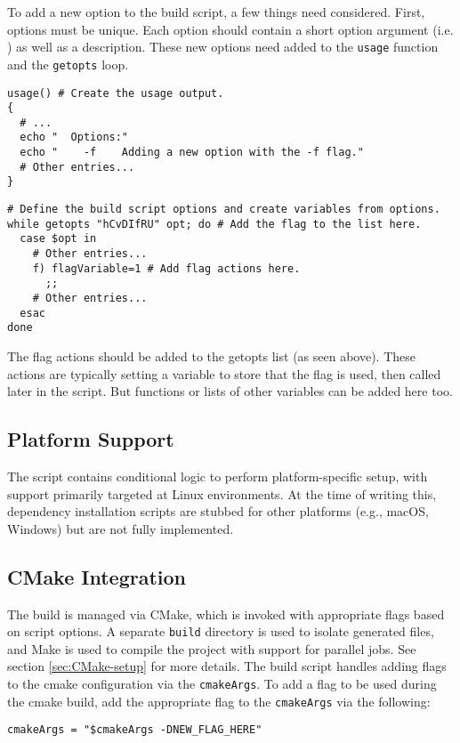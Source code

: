 To add a new option to the build script, a few things need considered. First, options must be unique. Each option should contain a short option argument (i.e. ) as well as a description. These new options need added to the \texttt{usage} function and the \texttt{getopts} loop.
\begin{lstlisting}[style=shellstyle]
usage() # Create the usage output.
{
  # ...
  echo "  Options:"
  echo "    -f    Adding a new option with the -f flag."
  # Other entries...
}
\end{lstlisting}
\begin{lstlisting}[style=shellstyle]
# Define the build script options and create variables from options.
while getopts "hCvDIfRU" opt; do # Add the flag to the list here.
  case $opt in
    # Other entries...
    f) flagVariable=1 # Add flag actions here.
      ;;
    # Other entries...
  esac
done
\end{lstlisting}
The flag actions should be added to the getopts list (as seen above). These actions are typically setting a variable to store that the flag is used, then called later in the script. But functions or lists of other variables can be added here too.

\subsection{Platform Support}

The script contains conditional logic to perform platform-specific setup, with support primarily targeted at Linux environments. At the time of writing this, dependency installation scripts are stubbed for other platforms (e.g., macOS, Windows) but are not fully implemented.

\subsection{CMake Integration}

The build is managed via CMake, which is invoked with appropriate flags based on script options. A separate \texttt{build} directory is used to isolate generated files, and Make is used to compile the project with support for parallel jobs. See section \ref{sec:CMake-setup} for more details. The build script handles adding flags to the cmake configuration via the \texttt{cmakeArgs}. To add a flag to be used during the cmake build, add the appropriate flag to the \texttt{cmakeArgs} via the following:
\begin{lstlisting}[style=shellstyle]
cmakeArgs = "$cmakeArgs -DNEW_FLAG_HERE"
\end{lstlisting}

